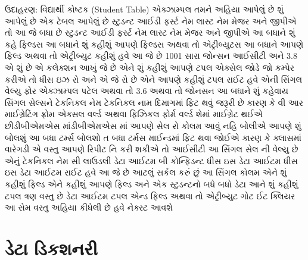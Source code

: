 \documentclass[aspectratio=169, 10pt]{beamer}
\begin{document}
\begin{frame}{ઉદાહરણ: વિદ્યાર્થી કોષ્ટક (Student Table)}
{એક્ઝામ્પલ તમને અહિયા આપેલું છે શું આપેલું છે એક ટેબલ આપેલું છે સ્ટુડન્ટ આઈડી ફર્સ્ટ નેમ લાસ્ટ નેમ મેજર અને જીપીએ તો આ જે બધા છે સ્ટુડન્ટ આઈડી ફર્સ્ટ નેમ લાસ્ટ નેમ મેજર અને જીપીએ આ બધાને શું કહે ફિલ્ડસ આ બધાને શું કહીશું આપણે ફિલ્ડસ અથવા તો એટ્રીબ્યુટસ આ બધાને આપણે ફિલ્ડ અથવા તો એટ્રીબ્યુટ કહીશું હવે આ જે છે 1001 સારા જોન્સન આઈસીટી અને 3.8 એ શું છે એ કલેક્શન આખું જે છે એને શું કહીશું આપણે ટપલ એક્સેલ જોડે જો કમ્પેર કરીએ તો ધીસ ઇઝ રો અને એ જે રો છે એને આપણે કહીશું ટપલ રાઈટ હવે એની સિંગલ વેલ્યુ ફોર એક્ઝામ્પલ પટેલ અથવા તો 3.6 અથવા તો જોનસન આ બધાને શું કહેવાય સિંગલ સેલ્સને ટેકનિકલ નેમ ટેકનિકલ નામ દિમાગમાં ફિટ થવું જરૂરી છે કારણ કે વી આર માઈગ્રેટિંગ ફ્રોમ એક્સલ વર્લ્ડ અથવા ફિઝિકલ ફોર્મ વર્લ્ડ શેમાં માઈગ્રેટ થઈએ છીડીબીએમએસ માંડીબીએમએસ માં આપણે સેલ રો કોલમ આવું નહિ બોલીએ આપણે શું બોલશું આ બધા ટર્મ્સ બોલશો ત બધા ટર્મસ માઈન્ડમાં ફિટ થવા જોઈએ કારણ કે ક્લાસમાં વારેગડી એ વસ્તુ આપણે રિપીટ નિ કરી શકીએ તો આઈસીટી આ સિંગલ સેલ ની વેલ્યુ છે એનું ટેકનિકલ નેમ સી લાઉડલી ડેટા આઈટમ બી કોન્ફિડન્ટ ધીસ ઇસ ડેટા આઈટમ ધીસ ઇસ ડેટા આઈટમ રાઈટ હવે આ જે છે આટલું સર્કલ કરું છું આ સિંગલ કોલમ એને શું કહીશું ફિલ્ડ એને કહીશું આપણે ફિલ્ડ અને એક સ્ટુડન્ટનો બધે બધો ડેટા આને શું કહીશું ટપલ ત્રણ વસ્તુ છે ડેટા આઈટમ ટપલ એન્ડ ફિલ્ડ અથવા તો એટ્રીબ્યુટ ગોટ ઈટ ક્લિયર આ સેમ વસ્તુ અહિયા કીધેલી છે હવે નેક્સ્ટ આવશે
}
\end{frame}

\section{ડેટા ડિકશનરી}
\end{document}
